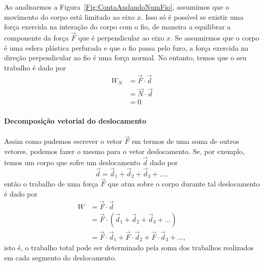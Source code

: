 Ao analisarmos a Figura~\ref{Fig:ContaAndandoNumFio}, assumimos que o movimento do corpo está limitado ao eixo $x$. Isso só é possível se existir uma força exercida na interação do corpo com o fio, de maneira a equilibrar a componente da força $\vec{F}$ que é perpendicular ao eixo $x$. Se assumirmos que o corpo é uma esfera plástica perfurada e que o fio passa pelo furo, a força exercida na direção perpendicular ao fio é uma força normal. No entanto, temos que o seu trabalho é dado por
\begin{align}
    W_N &= \vec{F}\cdot\vec{d} \\
    &= \vec{N}\cdot\vec{d} \\
    &= 0.
\end{align}

\paragraph{Decomposição vetorial do deslocamento}

Assim como pudemos escrever o vetor $\vec{F}$ em termos de uma soma de outros vetores, podemos fazer o mesmo para o vetor deslocamento. Se, por exemplo, temos um corpo que sofre um deslocamento $\vec{d}$ dado por
\begin{equation}
    \vec{d} = \vec{d}_1 + \vec{d}_2 + \vec{d}_3 + \dots,
\end{equation}
%
então o trabalho de uma força $\vec{F}$ que atua sobre o corpo durante tal deslocamento é dado por
\begin{align}
    W &= \vec{F}\cdot\vec{d} \\
    &= \vec{F}\cdot(\vec{d}_1 + \vec{d}_2 + \vec{d}_3 + \dots) \\
    &= \vec{F}\cdot\vec{d}_1 + \vec{F}\cdot\vec{d}_2 + \vec{F}\cdot\vec{d}_3 + \dots,
\end{align}
%
isto é, o trabalho total pode ser determinado pela soma dos trabalhos realizados em cada segmento do deslocamento.

